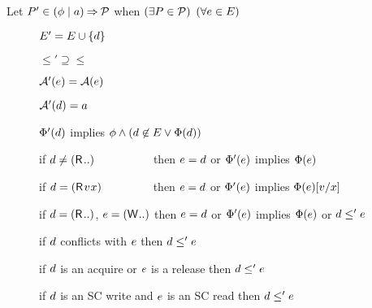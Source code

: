 \begin{definition}
  Let $P'\in(\phi \mid a) \mathbin\Rightarrow \mathcal{P}$ when
  $(\exists P\in\mathcal{P})$ $(\forall e\in E)$
  \begin{description}
  \item[{}] $E' = E \cup \{d\}$
  \item[{}] ${\le'}\supseteq{\le}$
  \item[{}]%
    $\mathcal{A}'(e) = \mathcal{A}(e)$
  \item[{}] $\mathcal{A}'(d) = a$
  \item[{}]%
    $\Phi'(d)$ implies
    $\phi\land(d\not\in E\lor\Phi(d))$
  \item[{}] if $\bEv\neq(\DR[]{..)}{}\mkern86mu$
    then $e=d$ or $\Phi'(e)$ implies $\Phi(e)$
  \item[{}] if
    $\bEv=(\DR[]{\aVal}{\aLoc})\mkern75mu$ then $e=d$ or
    $\Phi'(e)$ implies $\Phi(e)[v/x]$
  \item[{}]%
    if $\bEv=(\DR[]{..)}{}$, $\aEv=(\DW[]{..)}{}$ then $e=d$ or
    $\Phi'(e)$ implies $\Phi(e)$ or $d\le'e$
  \item[{}] if $d$ conflicts with
    $e$ %
    then $d\le'e$
  \item[{}] if $d$ is an acquire or $e$ is
    a release then $d \le' e$
  \item[{}] if $d$ is an SC write and $e$
    is an SC read then $d \le' e$
  \end{description}
\end{definition}

